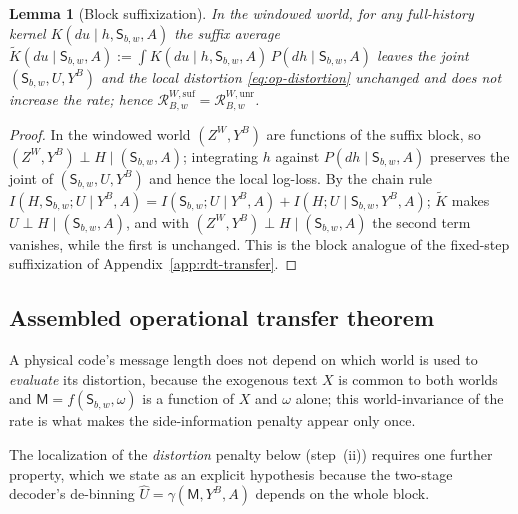 \documentclass[11pt]{article}
\theoremstyle{plain}
\newtheorem{lemma}[theorem]{Lemma}
\theoremstyle{definition}
\theoremstyle{remark}
\begin{document}
\begin{lemma}[Block suffixization]
\label{lem:op-suffix}
In the windowed world, for any full-history kernel
$K(du\mid h,\mathsf S_{b,w},A)$ the suffix average
$\widetilde K(du\mid \mathsf S_{b,w},A):=\int K(du\mid h,\mathsf S_{b,w},A)\,P(dh\mid\mathsf S_{b,w},A)$
leaves the joint $(\mathsf S_{b,w},U,Y^B)$ and the local distortion
\eqref{eq:op-distortion} unchanged and does not increase the rate;
hence $\mathcal R^{W,\mathrm{suf}}_{B,w}=\mathcal R^{W,\mathrm{unr}}_{B,w}$.
\end{lemma}
\begin{proof}
In the windowed world $(Z^W,Y^B)$ are functions of the suffix block,
so $(Z^W,Y^B)\perp H\mid(\mathsf S_{b,w},A)$; integrating $h$ against
$P(dh\mid\mathsf S_{b,w},A)$ preserves the joint of
$(\mathsf S_{b,w},U,Y^B)$ and hence the local log-loss. By the chain
rule $I(H,\mathsf S_{b,w};U\mid Y^B,A)=I(\mathsf S_{b,w};U\mid Y^B,A)+I(H;U\mid \mathsf S_{b,w},Y^B,A)$;
$\widetilde K$ makes $U\perp H\mid(\mathsf S_{b,w},A)$, and with
$(Z^W,Y^B)\perp H\mid(\mathsf S_{b,w},A)$ the second term vanishes,
while the first is unchanged. This is the block analogue of the
fixed-step suffixization of Appendix~\ref{app:rdt-transfer}.
\end{proof}

\subsection{Assembled operational transfer theorem}
\label{app:op-main}

A physical code's message length does not depend on which world is
used to \emph{evaluate} its distortion, because the exogenous text
$X$ is common to both worlds and $\mathsf M=f(\mathsf S_{b,w},\omega)$
is a function of $X$ and $\omega$ alone; this world-invariance of the
rate is what makes the side-information penalty appear only once.

The localization of the \emph{distortion} penalty below (step~(ii))
requires one further property, which we state as an explicit
hypothesis because the two-stage decoder's de-binning
$\hat U=\gamma(\mathsf M,Y^B,A)$ depends on the whole block.
\end{document}
